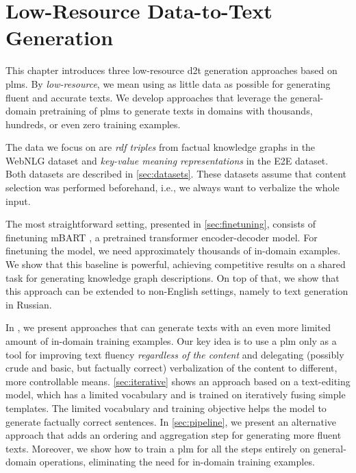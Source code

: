 \chapter{Low-Resource Data-to-Text Generation}
\label{chap:low-res}

This chapter introduces three low-resource \ac{d2t} generation approaches based on \acp{plm}. By \emph{low-resource}, we mean using as little data as possible for generating fluent and accurate texts. We develop approaches that leverage the general-domain pretraining of \acp{plm} to generate texts in domains with thousands, hundreds, or even zero training examples.

The data we focus on are \emph{\acs{rdf} triples} from factual knowledge graphs in the WebNLG dataset and \emph{key-value meaning representations} in the E2E dataset. Both datasets are described in \autoref{sec:datasets}. These datasets assume that content selection was performed beforehand, i.e., we always want to verbalize the whole input.

The most straightforward setting, presented in \autoref{sec:finetuning}, consists of finetuning mBART \cite{liuMultilingualDenoisingPretraining2020}, a pretrained transformer encoder-decoder model. For finetuning the model, we need approximately thousands of in-domain examples. We show that this baseline is powerful, achieving competitive results on a shared task for generating knowledge graph descriptions. On top of that, we show that this approach can be extended to non-English settings, namely to text generation in Russian.

In , we present approaches that can generate texts with an even more limited amount of in-domain training examples. Our key idea is to use a \ac{plm} only as a tool for improving text fluency \emph{regardless of the content} and delegating (possibly crude and basic, but factually correct) verbalization of the content to different, more controllable means. \autoref{sec:iterative} shows an approach based on a text-editing model, which has a limited vocabulary and is trained on iteratively fusing simple templates. The limited vocabulary and training objective helps the model to generate factually correct sentences. In \autoref{sec:pipeline}, we present an alternative approach that adds an ordering and aggregation step for generating more fluent texts. Moreover, we show how to train a \ac{plm} for all the steps entirely on general-domain operations, eliminating the need for in-domain training examples.

